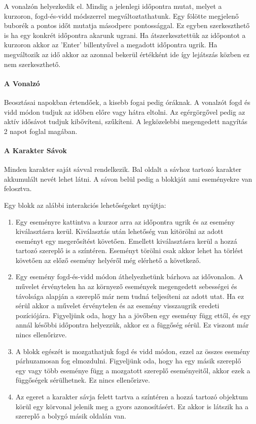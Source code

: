 A vonalzón helyezkedik el. Mindig a jelenlegi időpontra mutat, melyet a kurzoron, fogd-és-vidd módszerrel megváltoztathatunk. Egy fölötte megjelenő buborék a pontos időt mutatja másodperc pontossággal. Ez egyben szerkeszthető is ha egy konkrét időpontra akarunk ugrani. Ha átszerkesztettük az időpontot a kurzoron akkor az 'Enter' billentyűvel a megadott időpontra ugrik. Ha megváltozik az idő akkor az azonnal bekerül értékként ide így lejátszás közben ez nem szerkeszthető.

\paragraph{A Vonalzó}

Beosztásai napokban értendőek, a kisebb fogai pedig óráknak. A vonalzót fogd és vidd módon tudjuk az időben előre vagy hátra eltolni. Az egérgörgővel pedig az aktív idősávot tudjuk kibővíteni, szűkíteni. A legközelebbi megengedett nagyítás 2 napot foglal magában.

\paragraph{A Karakter Sávok}

Minden karakter saját sávval rendelkezik. Bal oldalt a sávhoz tartozó karakter akkumulált nevét lehet látni. A sávon belül pedig a blokkját ami eseményekre van felosztva.

Egy blokk az alábbi interakciós lehetőségeket nyújtja:
\begin{enumerate}
	\item Egy eseményre kattintva a kurzor arra az időpontra ugrik és az esemény kiválasztásra kerül. Kiválasztás után lehetőség van kitörölni az adott eseményt egy megerősítést követően. Emellett kiválasztásra kerül a hozzá tartozó szereplő is a színtéren. Eseményt törölni csak akkor lehet ha törlést követően az előző esemény helyéről még elérhető a következő.
	\item Egy esemény fogd-és-vidd módon áthelyezhetünk bárhova az idővonalon. A művelet érvénytelen ha az környező események megengedett sebességei és távolsága alapján a szereplő már nem tudná teljesíteni az adott utat. Ha ez sérül akkor a művelet érvénytelen és az esemény visszaugrik eredeti pozíciójára. Figyeljünk oda, hogy ha a jövőben egy esemény függ ettől, és egy annál későbbi időpontra helyezzük, akkor ez a függőség sérül. Ez viszont már nincs ellenőrizve.
	\item A blokk egészét is mozgathatjuk fogd és vidd módon, ezzel az összes esemény párhuzamosan fog elmozdulni. Figyeljünk oda, hogy ha egy másik szereplő egy vagy több eseménye függ a mozgatott szereplő eseményeitől, akkor ezek a függőségek sérülhetnek. Ez nincs ellenőrizve.
	\item Az egeret a karakter sávja felett tartva a színtéren a hozzá tartozó objektum körül egy körvonal jelenik meg a gyors azonosításért. Ez akkor is látszik ha a szereplő a bolygó másik oldalán van.
\end{enumerate}

